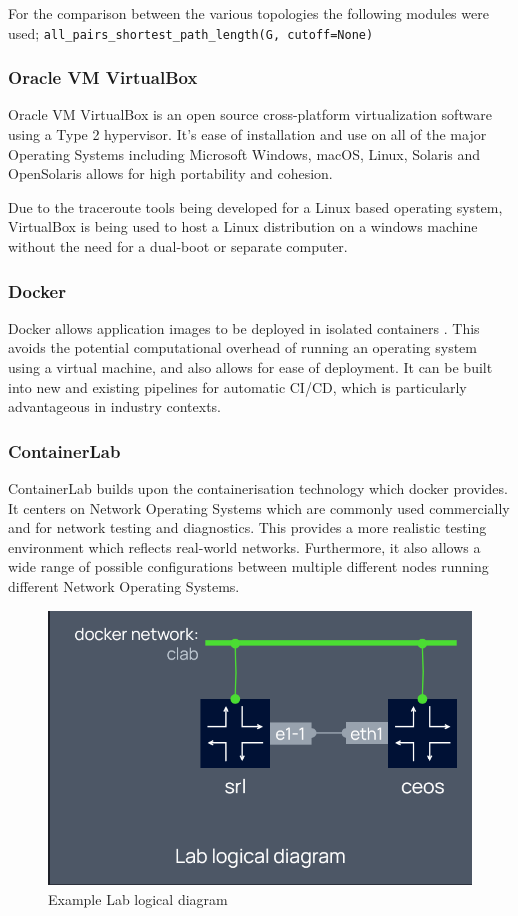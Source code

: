 For the comparison between the various topologies the following modules were used; \newline 
\verb|all_pairs_shortest_path_length(G, cutoff=None)|



\subsubsection{Oracle VM VirtualBox}
Oracle VM VirtualBox is an open source cross-platform virtualization software using a Type 2 hypervisor. \cite{VirtualWare} It's ease of installation and use on all of the major Operating Systems including Microsoft Windows, macOS, Linux, Solaris and OpenSolaris \cite{oracleVM} allows for high portability and cohesion. 

Due to the traceroute tools being developed for a Linux based operating system, VirtualBox is being used to host a Linux distribution on a windows machine without the need for a dual-boot or separate computer.

\subsubsection{Docker}
Docker allows application images to be deployed in isolated containers \cite{docker_isolate}. This avoids the potential computational overhead of running an operating system using a virtual machine, and also allows for ease of deployment. It can be built into new and existing pipelines for automatic CI/CD, which is particularly advantageous in industry contexts. 

\subsubsection{ContainerLab}

ContainerLab builds upon the containerisation technology which docker provides. It centers on Network Operating Systems which are commonly used commercially and for network testing and diagnostics. This provides a more realistic testing environment which reflects real-world networks. Furthermore, it also allows a wide range of possible configurations between multiple different nodes running different Network Operating Systems.

\begin{figure}
    \centering
    \includegraphics[width=0.5\linewidth]{images/lab_logical_diagram.png}
    \caption{Example Lab logical diagram \cite{containerlab}}
    \label{fig:lab_diagram_example}
\end{figure}

